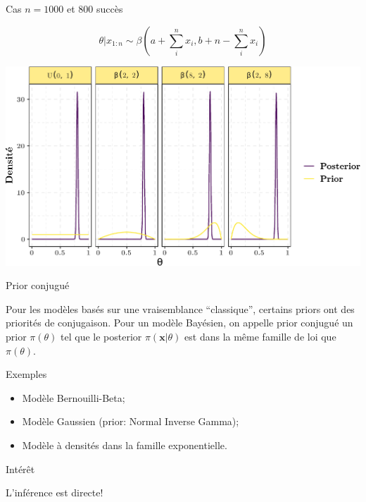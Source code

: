 \documentclass[9pt,ignorenonframetext,]{beamer}
\providecommand{\tightlist}{%
  \setlength{\itemsep}{0pt}\setlength{\parskip}{0pt}}
\begin{document}
\begin{frame}{Cas \(n = 1000\) et 800 succès}
\protect\hypertarget{cas-n-1000-et-800-succuxe8s}{}

\[\theta\vert x_{1:n} \sim \beta\left(a + \sum_{i}^n x_i, b + n - \sum_{i}^n x_i\right)\]

\includegraphics{diapos_inference_bayesienne_files/figure-beamer/plot_prior_posterior_large_samp-1.pdf}

\end{frame}

\begin{frame}{Prior conjugué}
\protect\hypertarget{prior-conjuguuxe9}{}

Pour les modèles basés sur une vraisemblance ``classique'', certains
priors ont des priorités de conjugaison. Pour un modèle Bayésien, on
appelle prior conjugué un prior \(\pi(\theta)\) tel que le posterior
\(\pi(\mathbf{x}\vert \theta)\) est dans la même famille de loi que
\(\pi(\theta)\).

\begin{block}{Exemples}

\begin{itemize}
\tightlist
\item
  Modèle Bernouilli-Beta;
\item
  Modèle Gaussien (prior: Normal Inverse Gamma);
\item
  Modèle à densités dans la famille exponentielle.
\end{itemize}

\end{block}

\begin{block}{Intérêt}

L'inférence est directe!

\end{block}

\end{frame}
\end{document}
